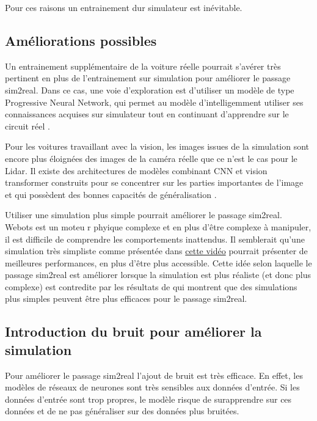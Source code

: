 \documentclass[french]{article}
\begin{document}
\vspace*{0.5cm}

Pour ces raisons un entrainement dur simulateur est inévitable. 

\subsection{Améliorations possibles}

Un entrainement supplémentaire de la voiture réelle pourrait s'avérer très pertinent en plus de l'entrainement sur simulation pour améliorer le passage sim2real. Dans ce cas, une voie d'exploration est d'utiliser un modèle de type Progressive Neural Network, qui permet au modèle d'intelligemment utiliser ses connaissances acquises sur simulateur tout en continuant d'apprendre sur le circuit réel \cite{rusu2022progressive}. 

\vspace{0.5cm}

Pour les voitures travaillant avec la vision, les images issues de la simulation sont encore plus éloignées des images de la caméra réelle que ce n'est le cas pour le Lidar. Il existe des architectures de modèles combinant CNN et vision transformer construits pour se concentrer sur les parties importantes de l'image et qui possèdent des bonnes capacités de généralisation \cite{li2023style}.

\vspace{0.5cm}

Utiliser une simulation plus simple pourrait améliorer le passage sim2real. Webots est un moteu r phyique complexe et en plus d'être complexe à manipuler, il est difficile de comprendre les comportements inattendus. Il semblerait qu'une simulation très simpliste comme présentée dans \href{https://www.youtube.com/watch?v=Cy155O5R1Oo&list=PLg2V2juOLiPWxd5fQOz1la37etAf9_WoW&index=4}{cette vidéo} pourrait présenter de meilleures performances, en plus d'être plus accessible. Cette idée selon laquelle le passage sim2real est améliorer lorsque la simulation est plus réaliste (et donc plus complexe) est contredite par les résultats de \cite{pmlr-v205-truong23a} qui montrent que des simulations plus simples peuvent être plus efficaces pour le passage sim2real.

\subsection{Introduction du bruit pour améliorer la simulation}
Pour améliorer le passage sim2real l'ajout de bruit est très efficace. En effet, les modèles de réseaux de neurones sont très sensibles aux données d'entrée. Si les données d'entrée sont trop propres, le modèle risque de surapprendre sur ces données et de ne pas généraliser sur des données plus bruitées.\vspace{0.5cm}
\end{document}
